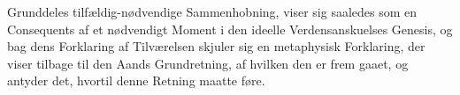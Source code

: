Grunddeles tilfældig-nødvendige Sammenhobning, viser sig
saaledes som en Consequents af et nødvendigt Moment i den
ideelle Verdensanskuelses Genesis, og bag dens Forklaring af
Tilværelsen skjuler sig en metaphysisk Forklaring, der viser
tilbage til den Aands Grundretning, af hvilken den er frem\-%
gaaet, og antyder det, hvortil denne Retning maatte føre.

